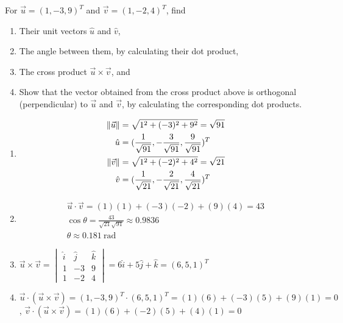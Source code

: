 \begin{Exercise}
For $\vec{u} = (1, -3, 9)^T$ and $\vec{v} = (1, -2, 4)^T$, find
\begin{enumerate}[label=(\alph*)]
\item Their unit vectors $\hat{u}$ and $\hat{v}$,
\item The angle between them, by calculating their dot product,
\item The cross product $\vec{u} \times \vec{v}$, and 
\item Show that the vector obtained from the cross product above is orthogonal (perpendicular) to $\vec{u}$ and $\vec{v}$, by calculating the corresponding dot products.
\end{enumerate}
\end{Exercise}
\begin{Answer}
\begin{enumerate}[label=(\alph*)]
\item 
\begin{align*}
\norm{\vec{u}} &= \sqrt{1^2 + (-3)^2 + 9^2} = \sqrt{91} \\
\hat{u} &= (\frac{1}{\sqrt{91}}, -\frac{3}{\sqrt{91}}, \frac{9}{\sqrt{91}})^T \\
\norm{\vec{v}} &= \sqrt{1^2 + (-2)^2 + 4^2} = \sqrt{21} \\
\hat{v} &= (\frac{1}{\sqrt{21}}, -\frac{2}{\sqrt{21}}, \frac{4}{\sqrt{21}})^T  
\end{align*}
\item 
\begin{align*}
\vec{u} \cdot \vec{v} = (1)(1) + (-3)(-2) + (9)(4) = 43 \\
\cos\theta = \frac{43}{\sqrt{21}\sqrt{91}} \approx 0.9836 \\
\theta \approx \SI{0.181}{\radian}    
\end{align*}
\item $\vec{u} \times \vec{v} = \begin{vmatrix}
\hat{i} & \hat{j} & \hat{k}\\
1 & -3 & 9\\
1 & -2 & 4
\end{vmatrix}
= 6\hat{i} + 5\hat{j} + \hat{k} = (6, 5, 1)^T$
\item $\vec{u} \cdot (\vec{u} \times \vec{v}) = (1, -3, 9)^T \cdot (6, 5, 1)^T = (1)(6) + (-3)(5) + (9)(1) = 0$, $\vec{v} \cdot (\vec{u} \times \vec{v}) = (1)(6) + (-2)(5) + (4)(1) = 0$
\end{enumerate}
\end{Answer}

